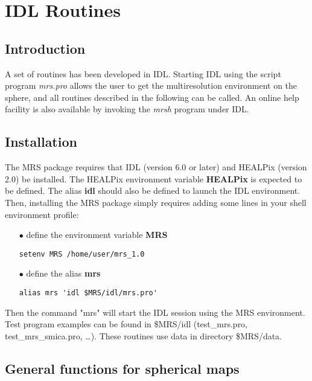 
\chapter{IDL Routines}
\label{ch_mrs_idl}


\section{Introduction}
A set of routines has been developed in IDL. Starting IDL using the script program {\em mrs.pro} allows the user 
to get the multiresolution environment on the sphere, and all routines described in the following can be called. 
An online help facility is also available by invoking the {\em mrsh} program under IDL.


\section{Installation}

The MRS package requires that IDL (version 6.0 or later) and HEALPix (version 2.0) be installed. The HEALPix environment 
variable \textbf{HEALPix} is expected to be defined. The alias \textbf{idl} should also be defined to launch the IDL environment. 
Then, installing the MRS package simply requires adding some lines in your shell environment profile:
\begin{itemize}
\item[$\bullet$] {define the environment variable \textbf{MRS}}  
\begin{verbatim}
setenv MRS /home/user/mrs_1.0
\end{verbatim}
 \item[$\bullet$]{define the alias \textbf{mrs}}  
\begin{verbatim}
alias mrs 'idl $MRS/idl/mrs.pro' 
\end{verbatim}
\end{itemize}
Then the command "mrs" will start the IDL session using the MRS environment. Test program examples can be found 
in \$MRS/idl (test\_mrs.pro, test\_mrs\_smica.pro, \dots). These routines use data in directory \$MRS/data.


\section{General functions for spherical maps}

